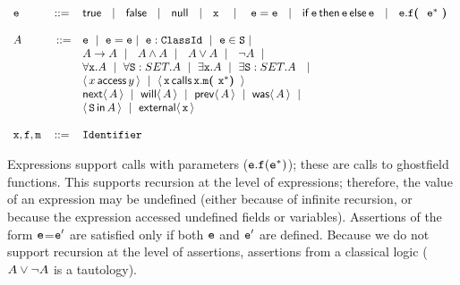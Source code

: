 \begin{definition}[Assertions]  
\label{def:assertions}


 $\begin{array}{lcl}
  ~  \\
 \SE  &\BBC&    \kwN{true}   ~\SOR~  \kwN{false}   ~\SOR~  \kwN{null}  ~\SOR~  \x  \   ~\SOR~  
     \   \SE=\SE    ~\SOR~ \kwN{if}\, \SE\,   \kwN{then}\,  \SE\,    \kwN{else}\, \SE    ~\SOR~  \SE.\f\lp\ \SE^* \ \rp\\
     \\
 \A &\ \BBC   &   \SE \   \mid \  \SE=\SE  \mid \   \SE:\prg{ClassId}  \ \mid \
    \SE\in\prg{S}   \mid  \  \\
    &
  &  \A \rightarrow \A  \ \mid\  \     \A \wedge \A  \ \mid\  \  \A \vee \A  \ \mid\  \ \neg A   \ \mid \ \\
  & &  \forall \x.\A  \ \mid \  \forall \prg{S}:SET.\A  \ \mid  \  \exists \x.\A  \ \mid \  \exists \prg{S}:SET.\A  \  \ \mid\   \\
 &    &  \CanAccess x y %
           \ \mid\  \Calls {\prg{x}}  {\prg{m}} {\prg{x}}  {\prg{x}^*}\\          
&    &  \Next \A  \ \mid \   \Future \A \ \mid \  \Prev \A   \ \mid \ \Past \A \ \mid \\  
 &    &        \Using \SF  \A  \ \mid \  \External \x     \\
 \\
 \x, \f, \m &\BBC&  \prg{Identifier}  ~ \\
\end{array}$
\end{definition}
 
Expressions support calls with parameters  (${\mbox{\tt{e}}}.{\mbox{\tt{f}}}({\mbox{\tt{e}}}^*)$); these are calls to ghostfield
functions. This  supports recursion at the level of expressions; therefore, the value of  an expression  may be
undefined (either because of infinite recursion, or because the expression accessed undefined fields or variables). 
Assertions of the form   ${\mbox{\tt{e}}}$=${\mbox{\tt{e}}}'$ are satisfied only if both ${\mbox{\tt{e}}}$ and ${\mbox{\tt{e}}}'$ are defined. Because we do not support 
recursion at the level of assertions, assertions from a classical logic (\eg $A \vee \neg A$ is a tautology).
 
